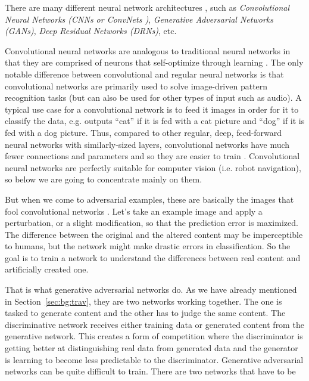 \documentclass[12pt,a4paper,table,dvipsnames,tikz]{report}
\newcommand{\alleg}{\enquote}
\newcommand{\term}{\textit}
\newcommand{\acronym}{\MakeUppercase}
\begin{document}
	There are many different neural network architectures \citep{Veen}, such as 
	\term{Convolutional Neural Networks (\acronym{cnn}s or ConvNets \citep{Simonyan_vgg})}, 
	\term{Generative Adversarial Networks (\acronym{gan}s)}, \term{Deep Residual Networks 
	(\acronym{drn}s)}, etc.
	\par
	Convolutional neural networks are analogous to traditional neural networks in 
	that they are comprised of neurons that self-optimize through learning \citep{Shea}. 
	The only notable difference between convolutional and regular neural networks is 
	that convolutional networks are primarily used to solve image-driven pattern 
	recognition tasks (but can also be used for other types of input such as audio). 
	A typical use case for a convolutional network is to feed it images in order for 
	it to classify the data, e.g. outputs \alleg{cat} if it is fed with a cat picture 
	and \alleg{dog} if it is fed with a dog picture. Thus, compared to other regular, 
	deep, feed-forward neural networks with similarly-sized layers, convolutional 
	networks have much fewer connections and parameters and so they are easier to train 
	\citep{Krizhevsky_alexnet}. Convolutional neural networks are perfectly suitable for 
	computer vision (i.e. robot navigation), so below we are going to concentrate 
	mainly on them.
	\label{eg:cat_dog}
	\par
	But when we come to adversarial examples, these are basically the images that fool 
	convolutional networks \citep{Deshpande}. Let’s take an example image and apply 
	a perturbation, or a slight modification, so that the prediction error is maximized. 
	The difference between the original and the altered content may be imperceptible 
	to humans, but the network might make drastic errors in classification. So the 
	goal is to train a network to understand the differences between real content and 
	artificially created one. 
	\par
	That is what generative adversarial networks 
	\citep{Goodfellow} do. As we have already mentioned in Section~\ref{sec:bg:trav}, 
	they are two networks working together. The one is tasked 
	to generate content and the other has to judge the same content. The discriminative 
	network receives either training data or generated content from the generative 
	network. This creates a form of competition where the discriminator is getting 
	better at distinguishing real data from generated data and the generator is 
	learning to become less predictable to the discriminator. Generative adversarial 
	networks can be quite difficult to train. There are two networks that have to be 
\end{document}
